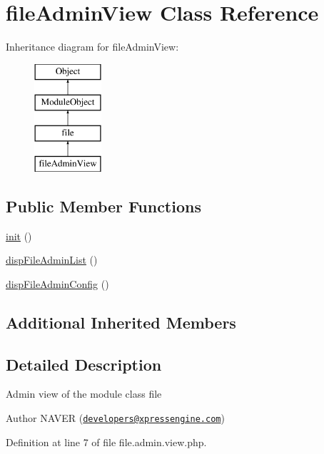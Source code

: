 \hypertarget{classfileAdminView}{}\section{file\+Admin\+View Class Reference}
\label{classfileAdminView}
Inheritance diagram for file\+Admin\+View\+:\begin{figure}[H]
\begin{center}
\leavevmode
\includegraphics[height=4.000000cm]{classfileAdminView}
\end{center}
\end{figure}
\subsection*{Public Member Functions}
\begin{DoxyCompactItemize}
\item 
\hyperlink{classfileAdminView_a0467616ea8da4c869f29f1660505e04d}{init} ()
\item 
\hyperlink{classfileAdminView_aba3607fab303d106fdf650c9a79dc753}{disp\+File\+Admin\+List} ()
\item 
\hyperlink{classfileAdminView_a6f748df78cc1df3dd8948dca1a7a04ae}{disp\+File\+Admin\+Config} ()
\end{DoxyCompactItemize}
\subsection*{Additional Inherited Members}


\subsection{Detailed Description}
Admin view of the module class file \begin{DoxyAuthor}{Author}
N\+A\+V\+ER (\href{mailto:developers@xpressengine.com}{\tt developers@xpressengine.\+com}) 
\end{DoxyAuthor}


Definition at line 7 of file file.\+admin.\+view.\+php.



